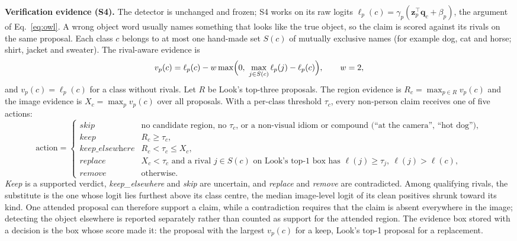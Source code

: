 \textbf{Verification evidence (S4).} The detector is unchanged and frozen; S4 works on its raw logits $\ell_p(c)=\gamma_p(\mathbf{z}_p^{\top}\mathbf{q}_c+\beta_p)$, the argument of Eq.~\eqref{eq:owl}. A wrong object word usually names something that looks like the true object, so the claim is scored against its rivals on the same proposal. Each class $c$ belongs to at most one hand-made set $S(c)$ of mutually exclusive names (for example dog, cat and horse; shirt, jacket and sweater). The rival-aware evidence is
\begin{equation*}
v_p(c)=\ell_p(c)-w\max\!\Big(0,\ \max_{j\in S(c)}\ell_p(j)-\ell_p(c)\Big),\qquad w=2,
\end{equation*}
and $v_p(c)=\ell_p(c)$ for a class without rivals. Let $R$ be Look's top-three proposals. The region evidence is $R_c=\max_{p\in R}v_p(c)$ and the image evidence is $X_c=\max_p v_p(c)$ over all proposals. With a per-class threshold $\tau_c$, every non-person claim receives one of five actions:
\begin{equation*}
\text{action}=\begin{cases}
\textit{skip} & \text{no candidate region, no }\tau_c\text{, or a non-visual idiom or compound (``at the camera'', ``hot dog'')},\\
\textit{keep} & R_c\ge\tau_c,\\
\textit{keep\_elsewhere} & R_c<\tau_c\le X_c,\\
\textit{replace} & X_c<\tau_c\text{ and a rival }j\in S(c)\text{ on Look's top-1 box has }\ell(j)\ge\tau_j,\ \ell(j)>\ell(c),\\
\textit{remove} & \text{otherwise.}
\end{cases}
\end{equation*}
\emph{Keep} is a supported verdict, \emph{keep\_elsewhere} and \emph{skip} are uncertain, and \emph{replace} and \emph{remove} are contradicted. Among qualifying rivals, the substitute is the one whose logit lies furthest above its class centre, the median image-level logit of its clean positives shrunk toward its kind. One attended proposal can therefore support a claim, while a contradiction requires that the claim is absent everywhere in the image; detecting the object elsewhere is reported separately rather than counted as support for the attended region. The evidence box stored with a decision is the box whose score made it: the proposal with the largest $v_p(c)$ for a keep, Look's top-1 proposal for a replacement.

